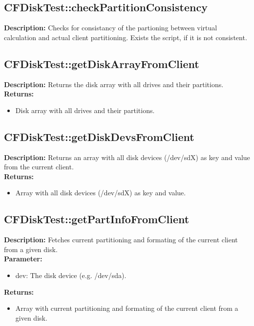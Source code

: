 \subsection{CFDiskTest::checkPartitionConsistency}
\textbf{Description:} Checks for consistancy of the partioning between virtual calculation and actual client partitioning. Exists the script, if it is not consistent.\\

\subsection{CFDiskTest::getDiskArrayFromClient}
\textbf{Description:} Returns the disk array with all drives and their partitions.\\
\textbf{Returns:}
\begin{itemize}
\item Disk array with all drives and their partitions.
\end{itemize}

\subsection{CFDiskTest::getDiskDevsFromClient}
\textbf{Description:} Returns an array with all disk devices (/dev/sdX) as key and value from the current client.\\
\textbf{Returns:}
\begin{itemize}
\item Array with all disk devices (/dev/sdX) as key and value.
\end{itemize}

\subsection{CFDiskTest::getPartInfoFromClient}
\textbf{Description:} Fetches current partitioning and formating of the current client from a given disk.\\
\textbf{Parameter:}
\begin{itemize}
\item dev: The disk device (e.g. /dev/sda).
\end{itemize}
\textbf{Returns:}
\begin{itemize}
\item Array with current partitioning and formating of the current client from a given disk.
\end{itemize}

